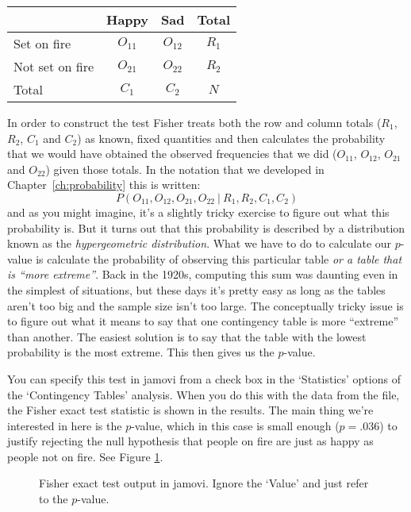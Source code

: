\begin{center}
\begin{tabular}{l|cc|c}
& Happy & Sad & Total \\ \hline
Set on fire   & $O_{11}$ & $O_{12}$ & $R_{1}$ \\
Not set on fire & $O_{21}$ & $O_{22}$ & $R_{2}$ \\ \hline
Total & $C_{1}$ & $C_{2}$ & $N$
\end{tabular}
\end{center}

\noindent
In order to construct the test Fisher treats both the row and column totals ($R_1$, $R_2$, $C_1$ and $C_2$) as known, fixed quantities and then calculates the probability that we would have obtained the observed frequencies that we did ($O_{11}$, $O_{12}$, $O_{21}$ and $O_{22}$) given those totals. In the notation that we developed in Chapter~\ref{ch:probability} this is written:
$$
P(O_{11}, O_{12}, O_{21}, O_{22} \ | \ R_1, R_2, C_1, C_2) 
$$
and as you might imagine, it's a slightly tricky exercise to figure out what this probability is. But it turns out that this probability is described by a distribution known as the {\it hypergeometric distribution}. What we have to do to calculate our $p$-value is calculate the probability of observing this particular table {\it or a table that is ``more extreme''}. Back in the 1920s, computing this sum was daunting even in the simplest of situations, but these days it's pretty easy as long as the tables aren't too big and the sample size isn't too large. The conceptually tricky issue is to figure out what it means to say that one contingency table is more ``extreme'' than another. The easiest solution is to say that the table with the lowest probability is the most extreme. This then gives us the $p$-value. 

You can specify this test in jamovi from a check box in the `Statistics' options of the `Contingency Tables' analysis. When you do this with the data from the  file, the Fisher exact test statistic is shown in the results. The main thing we're interested in here is the $p$-value, which in this case is small enough ($p=.036$) to justify rejecting the null hypothesis that people on fire are just as happy as people not on fire. See Figure \ref{fig:Fisher}.

\begin{figure}[!t]
\begin{center}
\caption{Fisher exact test output in jamovi. Ignore the `Value' and just refer to the $p$-value.}
\label{fig:Fisher}
\HR
\end{center}
\end{figure}

